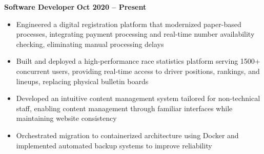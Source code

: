 \documentclass{article}
\newcommand{\textscbf}[1]{\textbf{\textsc{#1}}}
\begin{document}
\textbf{Software Developer} \hfill \textbf{Oct 2020 – Present}
\begin{itemize}[noitemsep,topsep=2pt]
\item Engineered a digital registration platform that modernized paper-based processes, integrating payment processing and real-time number availability checking, eliminating manual processing delays
\item Built and deployed a high-performance race statistics platform serving 1500+ concurrent users, providing real-time access to driver positions, rankings, and lineups, replacing physical bulletin boards
\item Developed an intuitive content management system tailored for non-technical staff, enabling content management through familiar interfaces while maintaining website consistency
\item Orchestrated migration to containerized architecture using Docker and implemented automated backup systems to improve reliability
\end{itemize}

%
%
%
%
\end{document}
